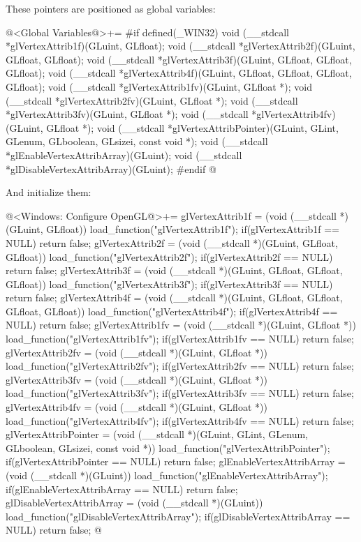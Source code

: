 These pointers are positioned as global variables:

\iniciocodigo
@<Global Variables@>+=
#if defined(_WIN32)
void (__stdcall *glVertexAttrib1f)(GLuint, GLfloat);
void (__stdcall *glVertexAttrib2f)(GLuint, GLfloat, GLfloat);
void (__stdcall *glVertexAttrib3f)(GLuint, GLfloat, GLfloat, GLfloat);
void (__stdcall *glVertexAttrib4f)(GLuint, GLfloat, GLfloat, GLfloat, GLfloat);
void (__stdcall *glVertexAttrib1fv)(GLuint, GLfloat *);
void (__stdcall *glVertexAttrib2fv)(GLuint, GLfloat *);
void (__stdcall *glVertexAttrib3fv)(GLuint, GLfloat *);
void (__stdcall *glVertexAttrib4fv)(GLuint, GLfloat *);
void (__stdcall *glVertexAttribPointer)(GLuint, GLint, GLenum, GLboolean,
                                        GLsizei, const void *);
void (__stdcall *glEnableVertexAttribArray)(GLuint);
void (__stdcall *glDisableVertexAttribArray)(GLuint);
#endif
@
\fimcodigo

And initialize them:

\iniciocodigo
@<Windows: Configure OpenGL@>+=
glVertexAttrib1f = (void (__stdcall *)(GLuint, GLfloat))
                    load_function("glVertexAttrib1f");
if(glVertexAttrib1f == NULL) return false;
glVertexAttrib2f = (void (__stdcall *)(GLuint, GLfloat, GLfloat))
                      load_function("glVertexAttrib2f");
if(glVertexAttrib2f == NULL) return false;
glVertexAttrib3f = (void (__stdcall *)(GLuint, GLfloat, GLfloat, GLfloat))
                      load_function("glVertexAttrib3f");
if(glVertexAttrib3f == NULL) return false;
glVertexAttrib4f = (void (__stdcall *)(GLuint, GLfloat, GLfloat, GLfloat,
                                       GLfloat))
                    load_function("glVertexAttrib4f");
if(glVertexAttrib4f == NULL) return false;
glVertexAttrib1fv = (void (__stdcall *)(GLuint, GLfloat *))
                       load_function("glVertexAttrib1fv");
if(glVertexAttrib1fv == NULL) return false;
glVertexAttrib2fv = (void (__stdcall *)(GLuint, GLfloat *))
                       load_function("glVertexAttrib2fv");
if(glVertexAttrib2fv == NULL) return false;
glVertexAttrib3fv = (void (__stdcall *)(GLuint, GLfloat *))
                       load_function("glVertexAttrib3fv");
if(glVertexAttrib3fv == NULL) return false;
glVertexAttrib4fv = (void (__stdcall *)(GLuint, GLfloat *))
                       load_function("glVertexAttrib4fv");
if(glVertexAttrib4fv == NULL) return false;
glVertexAttribPointer = (void (__stdcall *)(GLuint, GLint, GLenum, GLboolean,
                         GLsizei, const void *))
                              load_function("glVertexAttribPointer");
if(glVertexAttribPointer == NULL) return false;
glEnableVertexAttribArray = (void (__stdcall *)(GLuint))
                              load_function("glEnableVertexAttribArray");
if(glEnableVertexAttribArray == NULL) return false;
glDisableVertexAttribArray = (void (__stdcall *)(GLuint))
                               load_function("glDisableVertexAttribArray");
if(glDisableVertexAttribArray == NULL) return false;
@
\fimcodigo

